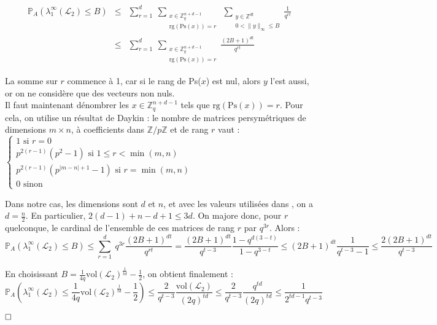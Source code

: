 \documentclass[11pt,a4paper]{article}
\begin{document}
\begin{eqnarray*}
\mathbb{P}_A(\lambda_1^\infty(\mathcal{L}_2) \leq B) &\leq& \sum_{r=1}^d \ \sum_{\substack{x \in \mathbb{Z}_q^{n+d-1} \\ \text{rg}(\text{Ps}(x))=r}} \   \sum_{\substack{y \in \mathbb{Z}^{dt} \\ 0 < \|y\|_\infty \leq B}} \frac{1}{q^{rt}} \\
&\leq& \sum_{r=1}^d \ \sum_{\substack{x \in \mathbb{Z}_q^{n+d-1} \\ \text{rg}(\text{Ps}(x))=r}} \frac{(2B+1)^{dt}}{q^{rt}}
\end{eqnarray*}

La somme sur $r$ commence à 1, car si le rang de Ps($x$) est nul, alors $y$ l'est aussi, or on ne considère que des vecteurs non nuls.\\
Il faut maintenant dénombrer les $x\in \mathbb{Z}_q^{n+d-1}$ tels que $\text{rg}(\text{Ps}(x))=r$. Pour cela, on utilise un résultat de Daykin \cite{rank} : le nombre de matrices persymétriques de dimensions $m\times n$, à coefficients dans $\mathbb{Z}/p\mathbb{Z}$ et de rang $r$ vaut : $\begin{cases} 1 \text{ si } r=0 \\ p^{2(r-1)}(p^2-1) \text{ si } 1 \leq r < \min(m,n) \\ p^{2(r-1)}(p^{|m-n|+1}-1) \text{ si } r=\min(m,n) \\ 0 \text{ sinon} \end{cases}$

Dans notre cas, les dimensions sont $d$ et $n$, et avec les valeurs utilisées dans \cite{mplwe}, on a $d=\frac{n}{2}$. En particulier, $2(d-1)+n-d +1 \leq 3d$. On majore donc, pour $r$ quelconque, le cardinal de l'ensemble de ces matrices de rang $r$ par $q^{3r}$. Alors : 
\[ \mathbb{P}_A(\lambda_1^\infty(\mathcal{L}_2) \leq B) \leq \sum_{r=1}^d \ q^{3r} \frac{(2B+1)^{dt}}{q^{rt}} = \frac{(2B+1)^{dt}}{q^{t-3}}\frac{1-q^{d(3-t)}}{1-q^{3-t}} \leq (2B+1)^{dt}\frac{1}{q^{t-3}-1} \leq \frac{2(2B+1)^{dt}}{q^{t-3}} 
\]

En choisissant $B=\frac{1}{4q}\text{vol}(\mathcal{L}_2)^{\frac{1}{td}}-\frac{1}{2}$, on obtient finalement : 
\[ \mathbb{P}_A(\lambda_1^\infty(\mathcal{L}_2) \leq \frac{1}{4q}\text{vol}(\mathcal{L}_2)^{\frac{1}{td}}-\frac{1}{2}) \leq \frac{2}{q^{t-3}}\frac{\text{vol}(\mathcal{L}_2)}{(2q)^{td}} \leq \frac{2}{q^{t-3}}\frac{q^{td}}{(2q)^{td}} \leq \frac{1}{2^{td-1}q^{t-3}} \]

$\hfill \square$ \\
\end{document}
